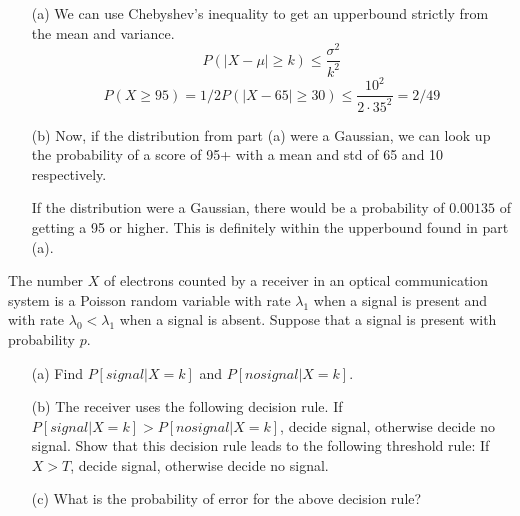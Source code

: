 \documentclass{article}
\begin{document}
    \begin{solution}
        \begin{itemize}
            \item[(a)] We can use Chebyshev's inequality to get an upperbound strictly from the mean and variance. 
            \begin{equation*}
                P(|X - \mu| \geq k) \leq \frac{\sigma^2}{k^2}
            \end{equation*}
            \begin{equation}
                P(X \geq 95) = 1/2P(|X - 65| \geq 30) \leq \frac{10^2}{2\cdot 35^2} = 2/49
            \end{equation}

            \item[(b)] Now, if the distribution from part (a) were a Gaussian, we can look up the probability of a score of 95+ with a mean and std of 65 and 10 respectively.

            If the distribution were a Gaussian, there would be a probability of $0.00135$ of getting a 95 or higher. This is definitely within the upperbound found in part (a).
        \end{itemize}
        
    \end{solution}

    \nextproblem
    \begin{problem}
        The number $X$ of electrons counted by a receiver in an optical communication system is a Poisson random variable with rate $\lambda_1$ when a signal is present and with rate $\lambda_0 < \lambda_1$ when a signal is absent. Suppose that a signal is present with probability $p$. 

        \begin{enumerate}
            \item[(a)] Find $P[signal|X = k]$ and $P[no signal|X = k]$.
            \item[(b)] The receiver uses the following decision rule. If $P[signal|X = k] > P[no signal|X = k]$, decide signal, otherwise decide no signal. Show that this decision rule leads to the following threshold rule: If $X > T$, decide signal, otherwise decide no signal.
            \item[(c)] What is the probability of error for the above decision rule?
        \end{enumerate}
    \end{problem}
\end{document}
